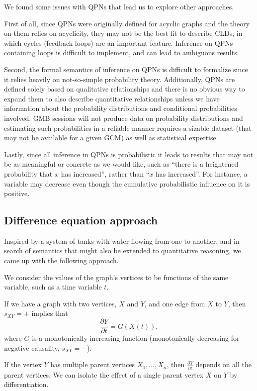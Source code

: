 We found some issues with QPNs that lead us to explore other
approaches.

First of all, since QPNs were originally defined for acyclic graphs
and the theory on them relies on acyclicity, they may not be the best
fit to describe CLDs, in which cycles (feedback loops) are an
important feature.
%
Inference on QPNs containing loops is difficult to implement, and can
lead to ambiguous results.

Second, the formal semantics of inference on QPNs is difficult to
formalize since it relies heavily on not-so-simple probability theory.
%
Additionally, QPNs are defined solely based on qualitative
relationships and there is no obvious way to expand them to also
describe quantitative relationships unless we have information about
the probability distributions and conditional probabilities involved.
%
GMB sessions will not produce data on probability distributions and
estimating such probabilities in a reliable manner requires a sizable
dataset (that may not be available for a given GCM) as well as
statistical expertise.

Lastly, since all inference in QPNs is probabilistic it leads to
results that may not be as meaningful or concrete as we would like,
such as ``there is a heightened probability that $x$ has increased'',
rather than ``$x$ has increased''.
%
For instance, a variable may decrease even though the cumulative
probabilistic influence on it is positive.

\subsection{Difference equation approach}

Inspired by a system of tanks with water flowing from one to another,
and in search of semantics that might also be extended to quantitative
reasoning, we came up with the following approach.

We consider the values of the graph's vertices to be functions of the
same variable, such as a time variable $t$.

If we have a graph with two vertices, $X$ and $Y$, and one edge from
$X$ to $Y$, then $s_{XY}=+$ implies that
%
\[\frac{\partial Y}{\partial t} = G(X(t)),\]
%
where $G$ is a monotonically increasing function (monotonically decreasing for negative
causality, $s_{XY}=-$).

If the vertex $Y$ has multiple parent vertices $X_1,\ldots,X_n$, then
$\frac{\partial Y}{\partial t}$ depends on all the parent vertices.
%
We can isolate the effect of a single parent vertex $X$ on $Y$ by
differentiation.

